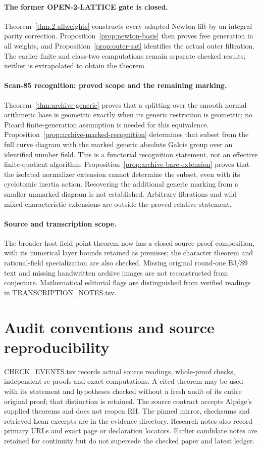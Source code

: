 \documentclass[11pt,a4paper]{article}
\theoremstyle{definition}
\begin{document}
\paragraph{The former OPEN-2-LATTICE gate is closed.}
Theorem~\ref{thm:2-allweights} constructs every adapted Newton lift
by an integral parity correction. Proposition~\ref{prop:newton-basis}
then proves free generation in all weights, and
Proposition~\ref{prop:outer-sat} identifies the actual outer filtration.
The earlier finite and class-two computations remain separate checked
results; neither is extrapolated to obtain the theorem.

\paragraph{Scan-85 recognition: proved scope and the remaining marking.}
Theorem~\ref{thm:archive-generic} proves that a splitting over the
smooth normal arithmetic base is geometric exactly when its generic
restriction is geometric; no Picard finite-generation assumption is
needed for this equivalence.
Proposition~\ref{prop:archive-marked-recognition} determines that
subset from the full curve diagram with the marked generic absolute
Galois group over an identified number field. This is a functorial
recognition statement, not an effective finite-quotient algorithm.
Proposition~\ref{prop:archive-bare-extension} proves that the isolated
normalizer extension cannot determine the subset, even with its
cyclotomic inertia action. Recovering the additional generic marking
from a smaller unmarked diagram is not established. Arbitrary
fibrations and wild mixed-characteristic extensions are outside the
proved relative statement.

\paragraph{Source and transcription scope.}
The broader host-field point theorem now has a closed source proof
composition, with its numerical layer bounds retained as premises;
the character theorem and rational-field specialization are also checked. Missing original
round-one B3/S9 text and missing handwritten archive images are not
reconstructed from conjecture. Mathematical editorial flags are
distinguished from verified readings in TRANSCRIPTION\_NOTES.tsv.

\section{Audit conventions and source reproducibility}
CHECK\_EVENTS.tsv records actual source readings, whole-proof checks,
independent re-proofs and exact computations. A cited theorem may be
used with its statement and hypotheses checked without a fresh audit of
its entire original proof; that distinction is retained. The source
contract accepts Alp\"oge's supplied theorems and does not reopen RH.
The pinned mirror, checksums and retrieved Lean excerpts are in the
evidence directory. Research notes also record primary URLs and exact
page or declaration locators. Earlier candidate notes are retained for
continuity but do not supersede the checked paper and latest ledger.
\end{document}
